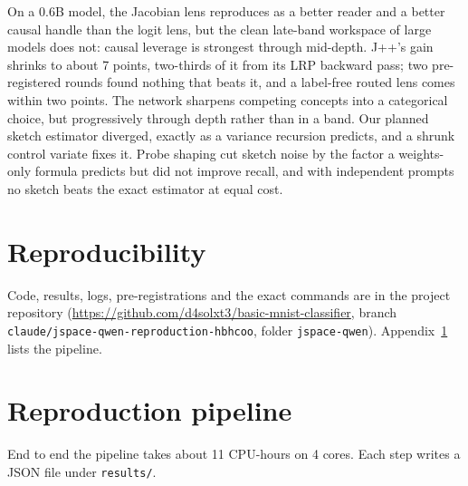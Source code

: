 \documentclass[11pt]{article}
\theoremstyle{definition}
\begin{document}
On a 0.6B model, the Jacobian lens reproduces as a better reader and a better causal handle than the
logit lens, but the clean late-band workspace of large models does not: causal leverage is strongest
through mid-depth. J++'s gain shrinks to about 7 points, two-thirds of it from its LRP backward pass;
two pre-registered rounds found nothing that beats it, and a label-free routed lens comes within two
points. The network sharpens competing concepts into a categorical choice, but
progressively through depth rather than in a band. Our planned sketch estimator diverged, exactly
as a variance recursion predicts, and a shrunk control variate fixes it. Probe shaping cut sketch noise
by the factor a weights-only formula predicts but did not improve recall, and with independent
prompts no sketch beats the exact estimator at equal cost.

\section*{Reproducibility}
Code, results, logs, pre-registrations and the exact commands are in the project repository
(\url{https://github.com/d4solxt3/basic-mnist-classifier}, branch
\texttt{claude/\allowbreak jspace-qwen-\allowbreak reproduction-\allowbreak hbhcoo}, folder \texttt{jspace-qwen}). Appendix~\ref{app:repro}
lists the pipeline.




\clearpage
\appendix

\section{Reproduction pipeline}
\label{app:repro}

End to end the pipeline takes about 11 CPU-hours on 4 cores. Each step writes a JSON file under
\texttt{results/}.
\end{document}
